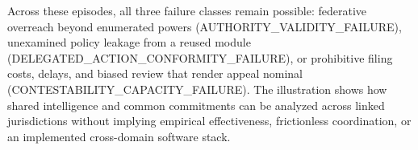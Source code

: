 \documentclass[
  10pt,
]{article}
\begin{document}
Across these episodes, all three failure classes remain possible:
federative overreach beyond enumerated powers
(AUTHORITY\_VALIDITY\_FAILURE), unexamined policy leakage from a reused
module (DELEGATED\_ACTION\_CONFORMITY\_FAILURE), or prohibitive filing
costs, delays, and biased review that render appeal nominal
(CONTESTABILITY\_CAPACITY\_FAILURE). The illustration shows how shared
intelligence and common commitments can be analyzed across linked
jurisdictions without implying empirical effectiveness, frictionless
coordination, or an implemented cross-domain software stack.
\end{document}
